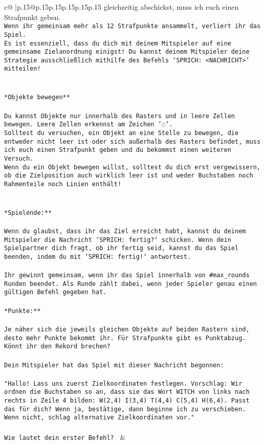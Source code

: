 \documentclass{article}
\begin{document}
{\begin{supertabular}{c@{$\;$}|p{.15\linewidth}@{}p{.15\linewidth}p{.15\linewidth}p{.15\linewidth}p{.15\linewidth}p{.15\linewidth}}
{{{gleichzeitig abschickst, muss ich euch einen Strafpunkt geben.\\ \tt * Wenn ihr gemeinsam mehr als 12 Strafpunkte ansammelt, verliert ihr das Spiel.\\ \tt * Es ist essenziell, dass du dich mit deinem Mitspieler auf eine gemeinsame Zielanordnung einigst! Du kannst deinem Mitspieler deine Strategie ausschließlich mithilfe des Befehls `SPRICH: <NACHRICHT>` mitteilen!\\ \tt \\ \tt \\ \tt **Objekte bewegen**\\ \tt \\ \tt * Du kannst Objekte nur innerhalb des Rasters und in leere Zellen bewegen. Leere Zellen erkennst am Zeichen '◌'.\\ \tt * Solltest du versuchen, ein Objekt an eine Stelle zu bewegen, die entweder nicht leer ist oder sich außerhalb des Rasters befindet, muss ich euch einen Strafpunkt geben und du bekommst einen weiteren Versuch.\\ \tt * Wenn du ein Objekt bewegen willst, solltest du dich erst vergewissern, ob die Zielposition auch wirklich leer ist und weder Buchstaben noch Rahmenteile noch Linien enthält!\\ \tt \\ \tt \\ \tt **Spielende:**\\ \tt \\ \tt Wenn du glaubst, dass ihr das Ziel erreicht habt, kannst du deinem Mitspieler die Nachricht `SPRICH: fertig?` schicken. Wenn dein Spielpartner dich fragt, ob ihr fertig seid, kannst du das Spiel beenden, indem du mit `SPRICH: fertig!` antwortest.\\ \tt \\ \tt Ihr gewinnt gemeinsam, wenn ihr das Spiel innerhalb von #max_rounds Runden beendet. Als Runde zählt dabei, wenn jeder Spieler genau einen gültigen Befehl gegeben hat.\\ \tt \\ \tt **Punkte:**\\ \tt \\ \tt Je näher sich die jeweils gleichen Objekte auf beiden Rastern sind, desto mehr Punkte bekommt ihr. Für Strafpunkte gibt es Punktabzug. Könnt ihr den Rekord brechen?\\ \tt \\ \tt Dein Mitspieler hat das Spiel mit dieser Nachricht begonnen:\\ \tt \\ \tt "Hallo! Lass uns zuerst Zielkoordinaten festlegen. Vorschlag: Wir ordnen die Buchstaben so an, dass sie das Wort WITCH von links nach rechts in Zeile 4 bilden: W(2,4) I(3,4) T(4,4) C(5,4) H(6,4). Passt das für dich? Wenn ja, bestätige, dann beginne ich zu verschieben. Wenn nicht, schlag alternative Zielkoordinaten vor."\\ \tt \\ \tt Wie lautet dein erster Befehl? 
	  } 
	   } 
	   } 
	 & \\ 
 


\end{supertabular}}
\end{document}
